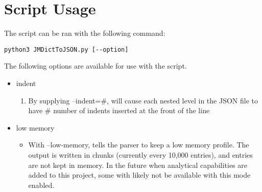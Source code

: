 \documentclass[11pt]{article}
\begin{document}
\section{Script Usage}
\label{sec-4}

The script can be ran with the following command:
\begin{verbatim}
python3 JMDictToJSON.py [--option]
\end{verbatim}

The following options are available for use with the script.

\begin{itemize}
\item indent
\begin{enumerate}
\item By supplying --indent=\#, will cause each nested level in the JSON file to have \# number of indents inserted at the front of the line
\end{enumerate}
\item low memory
\begin{itemize}
\item With --low-memory, tells the parser to keep a low memory profile. The output is written in chunks (currently every 10,000 entries), and
entries are not kept in memory. In the future when analytical capabilities are added to this project, some with likely not be available with this mode enabled.
\end{itemize}
\end{itemize}
\end{document}
